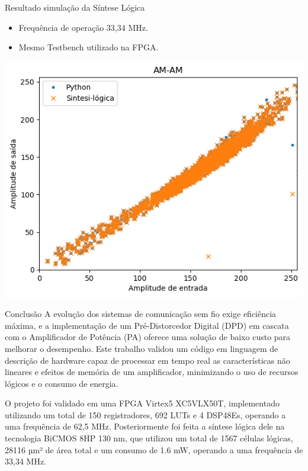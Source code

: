 \documentclass{if-beamer}
\begin{document}
\begin{frame}{Resultado simulação da Síntese Lógica}
	\begin{minipage}{0.5\textwidth}
		\begin{itemize}
			\item Frequência de operação 33,34 MHz.
			\item Mesmo Testbench utilizado na FPGA.
		\end{itemize}
		
	\end{minipage}%
	\hspace{0.04\textwidth}
	\begin{minipage}{0.5\textwidth}
		\includegraphics[scale=0.40]{sim_pos_sin.png}
	\end{minipage}
\end{frame}

\begin{frame}{Conclusão}
A evolução dos sistemas de comunicação sem fio exige eficiência máxima, e a implementação de um Pré-Distorcedor Digital (DPD) em cascata com o Amplificador de Potência (PA) oferece uma solução de baixo custo para melhorar o desempenho. Este trabalho validou um código em linguagem de descrição de hardware capaz de processar em tempo real as características não lineares e efeitos de memória de um amplificador, minimizando o uso de recursos lógicos e o consumo de energia.

O projeto foi validado em uma FPGA Virtex5 XC5VLX50T, implementado utilizando um total de 150 registradores, 692 LUTs e 4 DSP48Es, operando a uma frequência de 62,5 MHz. Posteriormente foi feita a síntese lógica dele na tecnologia BiCMOS 8HP 130 nm, que utilizou um total de 1567 células lógicas, 28116 µm² de área total e um consumo de 1.6 mW, operando a uma frequência de 33,34 MHz.
\end{frame}
\end{document}
